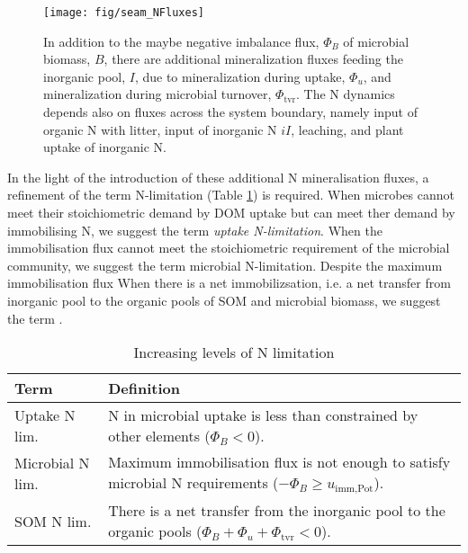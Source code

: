 \begin{figure}[t] \vspace*{2mm}
\begin{center}
\texttt{[image: fig/seam\_NFluxes]} 
\end{center}
\caption{
In addition to the maybe negative imbalance flux, $\Phi_B$ of microbial biomass,
$B$, there are additional mineralization fluxes feeding the inorganic pool, $I$,
due to mineralization during uptake, $\Phi_u$, and mineralization during
microbial turnover, $\Phi_{\operatorname{tvr}}$. The N dynamics depends also on
fluxes across the system boundary, namely input of organic N with litter, input
of inorganic N $iI$, leaching, and plant uptake of inorganic N.
\label{fig:SEAMStructNFluxes}}
\end{figure}

In the light of the introduction of these additional N mineralisation fluxes, a
refinement of the term N-limitation (Table
\ref{tab:NutrientLimDefs}) is required.
When microbes cannot meet their stoichiometric demand by DOM uptake but can
meet ther demand by immobilising N, we suggest the term \textit{uptake
N-limitation}.
When the immobilisation flux cannot meet the stoichiometric requirement of the
microbial community, we suggest the term microbial N-limitation. Despite the
maximum immobilisation flux  When there is a net
immobilizsation, i.e. a net transfer from inorganic pool to the organic pools of
SOM and microbial biomass, we suggest the term .

\begin{table}[t]
\caption{Increasing levels of N limitation \label{tab:NutrientLimDefs}}
\centering
\begin{tabular}{lp{5.5cm}}
\hline
Term &  Definition \\
\hline
Uptake N lim. & N in microbial uptake is less than 
constrained by other elements (${\Phi_B < 0}$).
\\
Microbial N lim. & Maximum immobilisation flux is not enough to satisfy
microbial N requirements (${-\Phi_B \ge
u_{\operatorname{imm,Pot}}}$).
\\
SOM N lim. & There is a net transfer from the inorganic pool to
the organic pools (${\Phi_B+\Phi_u+\Phi_{\operatorname{tvr}}<0}$).
\\
\hline
\end{tabular}
\end{table}
 



